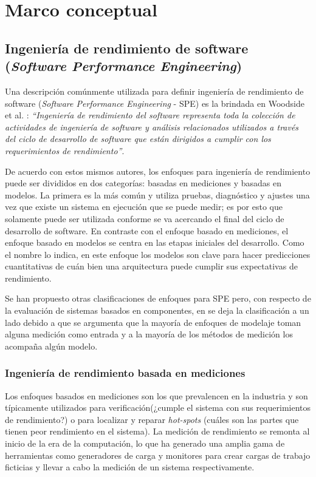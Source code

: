 \section{Marco conceptual}

\subsection{Ingeniería de rendimiento de software (\emph{Software Performance Engineering})}
Una descripción comúnmente utilizada para definir ingeniería de rendimiento de software  (\emph{Software Performance Engineering} - SPE)  es la brindada en Woodside et al. \cite{4221619}: \textit{``Ingeniería de rendimiento del software representa toda la colección de actividades de ingeniería de software y análisis relacionados utilizados a través del ciclo de desarrollo de software que están dirigidos a cumplir con los requerimientos de rendimiento''}. 

De acuerdo con estos mismos autores, los enfoques para ingeniería de rendimiento puede ser divididos en dos categorías: basadas en mediciones y basadas en modelos. La primera es la más común y utiliza pruebas, diagnóstico y ajustes una vez que existe un sistema en ejecución que se puede medir; es por esto que solamente puede ser utilizada conforme se va acercando el final del ciclo de desarrollo de software. En contraste con el enfoque basado en mediciones, el enfoque basado en modelos se centra en las etapas iniciales del desarrollo. Como el nombre lo indica, en este enfoque los modelos son clave para hacer predicciones cuantitativas de cuán bien una arquitectura puede cumplir sus expectativas de rendimiento.

Se han propuesto otras clasificaciones de enfoques para SPE pero, con respecto de la evaluación de sistemas basados en componentes, en \cite{Koziolek:2010:PEC:1808359.1808729} se deja la clasificación a un lado debido a que se argumenta que la mayoría de enfoques de modelaje toman alguna medición como entrada y a la mayoría de los métodos de medición los acompaña algún modelo.

\subsubsection{Ingeniería de rendimiento basada en mediciones}
Los enfoques basados en mediciones son los que prevalencen en la industria\cite{Gooijer2011PerformanceMO} y son típicamente utilizados para verificación(¿cumple el sistema con sus requerimientos de rendimiento?) o para localizar y reparar \emph{hot-spots} (cuáles son las partes que tienen peor rendimiento en el sistema). La medición de rendimiento se remonta al inicio de la era de la computación, lo que ha generado una amplia gama de herramientas como generadores de carga y monitores para crear cargas de trabajo ficticias y llevar a cabo la medición de un sistema respectivamente.

